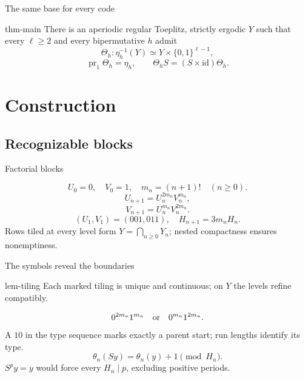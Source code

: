 \documentclass{beamer}
\begin{document}
\begin{frame}{The same base for every code}
\begin{bookresult}{thm-main}
There is an aperiodic regular Toeplitz, strictly ergodic $Y$ such that every $\ell\geq2$ and every bipermutative $h$ admit
\[
\Theta_h:\eta_h^{-1}(Y)\simeq Y\times\{0,1\}^{\ell-1},
\]
\[
\operatorname{pr}_1\Theta_h=\eta_h,\qquad
\Theta_h S=(S\times\mathrm{id})\Theta_h.
\]
\end{bookresult}
\end{frame}

\section{Construction}
\subsection{Recognizable blocks}

\begin{frame}{Factorial blocks}

\[
U_0=0,\quad V_0=1,\quad m_n=(n+1)!\quad(n\geq0).
\]
\[
U_{n+1}=U_n^{2m_n}V_n^{m_n},
\]
\[
V_{n+1}=U_n^{m_n}V_n^{2m_n}.
\]
\[
(U_1,V_1)=(001,011),\quad H_{n+1}=3m_nH_n.
\]
Rows tiled at every level form $Y=\bigcap_{n\geq0}Y_n$; nested compactness ensures nonemptiness.
\end{frame}

\begin{frame}{The symbols reveal the boundaries}

\begin{bookresult}{lem-tiling}
Each marked tiling is unique and continuous; on $Y$ the levels refine compatibly.
\end{bookresult}
\[
0^{2m_n}1^{m_n}\quad\hbox{or}\quad0^{m_n}1^{2m_n}.
\]
A $10$ in the type sequence marks exactly a parent start; run lengths identify its type.
\[
\theta_n(Sy)=\theta_n(y)+1\pmod {H_n}.
\]
$S^py=y$ would force every $H_n\mid p$, excluding positive periods.
\end{frame}
\end{document}
